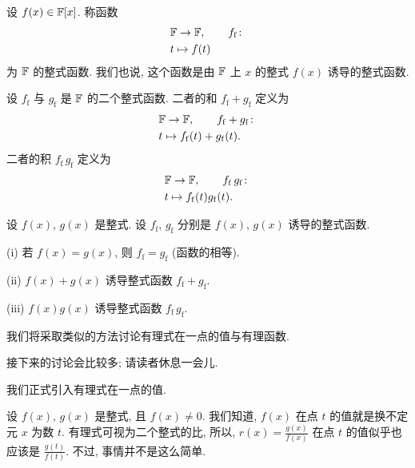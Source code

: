 \begin{definition}
    设 $f(x) \in \mathbb{F}[x]$. 称函数
    \begin{align*}
         & \FF \to \FF, \tag*{$f_\mathrm{f} \colon$} \\
         & t \mapsto f(t)
    \end{align*}
    为 $\mathbb{F}$ 的整式函数. 我们也说, 这个函数是由 $\mathbb{F}$ 上 $x$ 的整式 $f(x)$ 诱导的整式函数.
\end{definition}

\begin{definition}
    设 $f_\mathrm{f}$ 与 $g_\mathrm{f}$ 是 $\mathbb{F}$ 的二个整式函数. 二者的和 $f_\mathrm{f} + g_\mathrm{f}$ 定义为
    \begin{align*}
         & \FF \to \FF, \tag*{$f_\mathrm{f} + g_\mathrm{f} \colon$} \\
         & t \mapsto f_\mathrm{f} (t) + g_\mathrm{f} (t).
    \end{align*}
    二者的积 $f_\mathrm{f} \, g_\mathrm{f}$ 定义为
    \begin{align*}
         & \FF \to \FF, \tag*{$f_\mathrm{f} \, g_\mathrm{f} \colon$} \\
         & t \mapsto f_\mathrm{f} (t) g_\mathrm{f} (t).
    \end{align*}
\end{definition}

\begin{proposition}
    设 $f(x)$, $g(x)$ 是整式. 设 $f_\mathrm{f}$, $g_\mathrm{f}$ 分别是 $f(x)$, $g(x)$ 诱导的整式函数.

    (i) 若 $f(x) = g(x)$, 则 $f_\mathrm{f} = g_\mathrm{f}$ (函数的相等).

    (ii) $f(x) + g(x)$ 诱导整式函数 $f_\mathrm{f} + g_\mathrm{f}$.

    (iii) $f(x) g(x)$ 诱导整式函数 $f_\mathrm{f} \, g_\mathrm{f}$.
\end{proposition}

我们将采取类似的方法讨论有理式在一点的值与有理函数.

接下来的讨论会比较多; 请读者休息一会儿.

\myLine

我们正式引入有理式在一点的值.

设 $f(x)$, $g(x)$ 是整式, 且 $f(x) \neq 0$. 我们知道, $f(x)$ 在点 $t$ 的值就是换不定元 $x$ 为数 $t$. 有理式可视为二个整式的比, 所以, $r(x) = \frac{g(x)}{f(x)}$ 在点 $t$ 的值似乎也应该是 $\frac{g(t)}{f(t)}$. 不过, 事情并不是这么简单.

